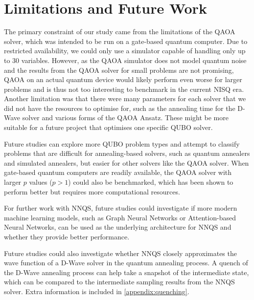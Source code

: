 \section{Limitations and Future Work}
The primary constraint of our study came from the limitations of the QAOA solver, which was intended to be run on a gate-based quantum computer. Due to restricted availability, we could only use a simulator capable of handling only up to $30$ variables. However, as the QAOA simulator does not model quantum noise and the results from the QAOA solver for small problems are not promising, QAOA on an actual quantum device would likely perform even worse for larger problems and is thus not too interesting to benchmark in the current NISQ era. Another limitation was that there were many parameters for each solver that we did not have the resources to optimise for, such as the annealing time for the D-Wave solver and various forms of the QAOA Ansatz. These might be more suitable for a future project that optimises one specific QUBO solver.

Future studies can explore more QUBO problem types and attempt to classify problems that are difficult for annealing-based solvers, such as quantum annealers and simulated annealers, but easier for other solvers like the QAOA solver. When gate-based quantum computers are readily available, the QAOA solver with larger $p$ values ($p > 1$) could also be benchmarked, which has been shown to perform better but requires more computational resources.

For further work with NNQS, future studies could investigate if more modern machine learning models, such as Graph Neural Networks or Attention-based Neural Networks, can be used as the underlying architecture for NNQS and whether they provide better performance.

Future studies could also investigate whether NNQS closely approximates the wave function of a D-Wave solver in the quantum annealing process. A quench of the D-Wave annealing process can help take a snapshot of the intermediate state, which can be compared to the intermediate sampling results from the NNQS solver. Extra information is included in \autoref{appendix:quenching}.